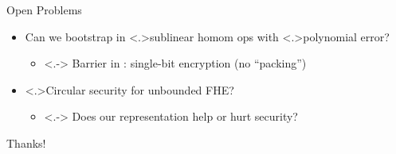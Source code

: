 \documentclass[shadow,xcolor=pdftex,svgnames,table,t]{beamer}
\begin{document}
\begin{frame}[label=thanks]{Open Problems}
  \begin{itemize}
  \item<+-> Can we bootstrap in \alert<.>{sublinear homom ops} with
    \alert<.>{polynomial error}?
    \begin{itemize}
    \item<.-> Barrier in {\citationsize [GSW'13]}: single-bit
      encryption (no ``packing'')
    \end{itemize}

    \medskip
  \item<+-> \alert<.>{Circular security} for unbounded FHE?
    \begin{itemize}
    \item<.-> Does our representation help or hurt security?
    \end{itemize}
  \end{itemize}

  \medskip
  \onslide<+->
  \begin{center}\Large
    Thanks!
  \end{center}
\end{frame}
\end{document}
